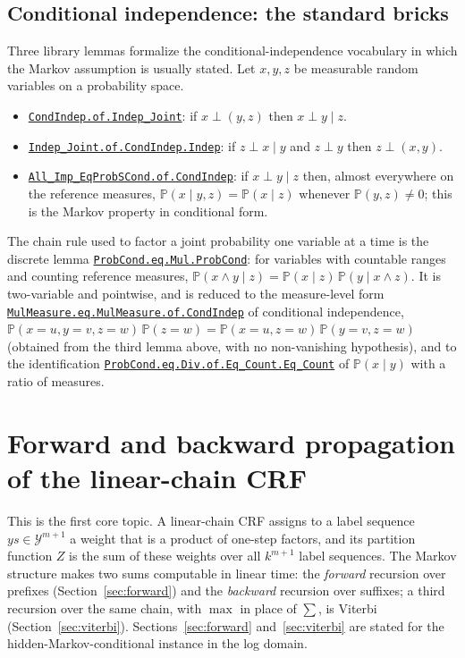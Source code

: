 \documentclass[11pt,a4paper]{article}
\newcommand{\lmod}[2]{\href{http://www.lemma.cn/lean/?module=#2}{\nolinkurl{#1}}}
\newcommand{\Prb}{\mathbb{P}}
\newcommand{\Y}{\mathcal{Y}}
\begin{document}
\subsection{Conditional independence: the standard bricks}
\label{sec:cond}
Three library lemmas formalize the conditional-independence vocabulary in which the Markov assumption is usually stated.
Let $x,y,z$ be measurable random variables on a probability space.
\begin{itemize}[leftmargin=1.6em,itemsep=0.2em]
  \item \lmod{CondIndep.of.Indep_Joint}{Random.CondIndep.of.Indep_Joint}: if $x\perp(y,z)$ then $x\perp y\mid z$.
  \item \lmod{Indep_Joint.of.CondIndep.Indep}{Random.Indep_Joint.of.CondIndep.Indep}: if $z\perp x\mid y$ and $z\perp y$ then $z\perp(x,y)$.
  \item \lmod{All_Imp_EqProbSCond.of.CondIndep}{Random.All_Imp_EqProbSCond.of.CondIndep}: if $x\perp y\mid z$ then, almost everywhere on the reference measures, $\Prb(x\mid y,z)=\Prb(x\mid z)$ whenever $\Prb(y,z)\ne0$; this is the Markov property in conditional form.
\end{itemize}
The chain rule used to factor a joint probability one variable at a time is the discrete lemma \lmod{ProbCond.eq.Mul.ProbCond}{Random.ProbCond.eq.Mul.ProbCond}: for variables with countable ranges and counting reference measures, $\Prb(x\wedge y\mid z)=\Prb(x\mid z)\,\Prb(y\mid x\wedge z)$.
It is two-variable and pointwise, and is reduced to the measure-level form \lmod{MulMeasure.eq.MulMeasure.of.CondIndep}{Random.MulMeasure.eq.MulMeasure.of.CondIndep} of conditional independence, $\Prb(x{=}u,y{=}v,z{=}w)\,\Prb(z{=}w)=\Prb(x{=}u,z{=}w)\,\Prb(y{=}v,z{=}w)$ (obtained from the third lemma above, with no non-vanishing hypothesis), and to the identification \lmod{ProbCond.eq.Div.of.Eq_Count.Eq_Count}{Random.ProbCond.eq.Div.of.Eq_Count.Eq_Count} of $\Prb(x\mid y)$ with a ratio of measures.

\section{Forward and backward propagation of the linear-chain CRF}
\label{sec:crf}

This is the first core topic.
A linear-chain CRF assigns to a label sequence $ys\in\Y^{m+1}$ a weight that is a product of one-step factors, and its partition function $Z$ is the sum of these weights over all $k^{m+1}$ label sequences.
The Markov structure makes two sums computable in linear time: the \emph{forward} recursion over prefixes (Section~\ref{sec:forward}) and the \emph{backward} recursion over suffixes; a third recursion over the same chain, with $\max$ in place of $\sum$, is Viterbi (Section~\ref{sec:viterbi}).
Sections~\ref{sec:forward} and~\ref{sec:viterbi} are stated for the hidden-Markov-conditional instance in the log domain.
\end{document}
